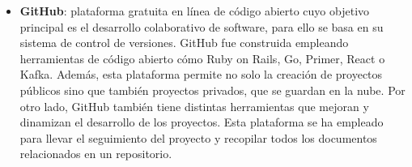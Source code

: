 \begin{itemize}
\item \textbf{GitHub}\cite{GitHub}: plataforma gratuita en línea de código abierto cuyo objetivo principal es el desarrollo colaborativo de software, para ello se basa en su sistema de control de versiones. GitHub fue construida empleando herramientas de código abierto cómo  Ruby on Rails, Go, Primer, React o Kafka. Además, esta plataforma permite no solo la creación de proyectos públicos sino que también proyectos privados, que se guardan en la nube. Por otro lado, GitHub también tiene distintas herramientas que mejoran y dinamizan el desarrollo de los proyectos. Esta plataforma se ha empleado para llevar el seguimiento del proyecto y recopilar todos los documentos relacionados en un repositorio.


\end{itemize}

